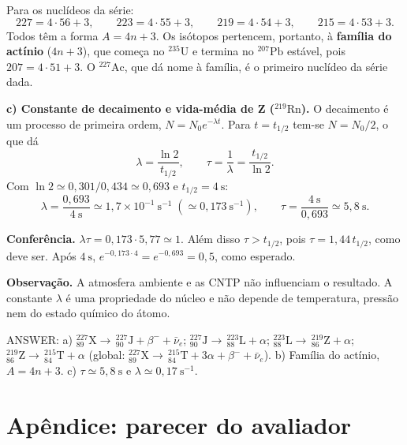 \documentclass{article}%
\begin{document}
Para os nuclídeos da série:
\[
227=4\cdot56+3,\qquad 223=4\cdot55+3,\qquad 219=4\cdot54+3,\qquad 215=4\cdot53+3 .
\]
Todos têm a forma $A=4n+3$. Os isótopos pertencem, portanto, à \textbf{família do actínio} ($4n+3$), que começa no $^{235}\mathrm{U}$ e termina no $^{207}\mathrm{Pb}$ estável, pois $207=4\cdot51+3$. O $^{227}\mathrm{Ac}$, que dá nome à família, é o primeiro nuclídeo da série dada.

\medskip
\textbf{c) Constante de decaimento e vida-média de Z ($^{219}\mathrm{Rn}$).}
O decaimento é um processo de primeira ordem, $N=N_0e^{-\lambda t}$. Para $t=t_{1/2}$ tem-se $N=N_0/2$, o que dá
\[
\lambda=\frac{\ln 2}{t_{1/2}},\qquad
\tau=\frac{1}{\lambda}=\frac{t_{1/2}}{\ln 2}.
\]
Com $\ln 2\simeq 0{,}301/0{,}434\simeq 0{,}693$ e $t_{1/2}=4\ \text{s}$:
\[
\lambda=\frac{0{,}693}{4\ \text{s}}\simeq 1{,}7\times10^{-1}\ \text{s}^{-1}\;(\simeq 0{,}173\ \text{s}^{-1}),
\qquad
\tau=\frac{4\ \text{s}}{0{,}693}\simeq 5{,}8\ \text{s}.
\]

\textbf{Conferência.} $\lambda\tau=0{,}173\cdot5{,}77\simeq1$. Além disso $\tau>t_{1/2}$, pois $\tau=1{,}44\,t_{1/2}$, como deve ser. Após $4\ \text{s}$, $e^{-0{,}173\cdot4}=e^{-0{,}693}=0{,}5$, como esperado.

\textbf{Observação.} A atmosfera ambiente e as CNTP não influenciam o resultado. A constante $\lambda$ é uma propriedade do núcleo e não depende de temperatura, pressão nem do estado químico do átomo.

ANSWER: a) $^{227}_{89}\mathrm{X}\to\,^{227}_{90}\mathrm{J}+\beta^-+\bar\nu_e$; $^{227}_{90}\mathrm{J}\to\,^{223}_{88}\mathrm{L}+\alpha$; $^{223}_{88}\mathrm{L}\to\,^{219}_{86}\mathrm{Z}+\alpha$; $^{219}_{86}\mathrm{Z}\to\,^{215}_{84}\mathrm{T}+\alpha$ (global: $^{227}_{89}\mathrm{X}\to\,^{215}_{84}\mathrm{T}+3\alpha+\beta^-+\bar\nu_e$). b) Família do actínio, $A=4n+3$. c) $\tau\simeq5{,}8\ \text{s}$ e $\lambda\simeq0{,}17\ \text{s}^{-1}$.
%
\newpage%
\section*{Apêndice: parecer do avaliador}%
\end{document}

